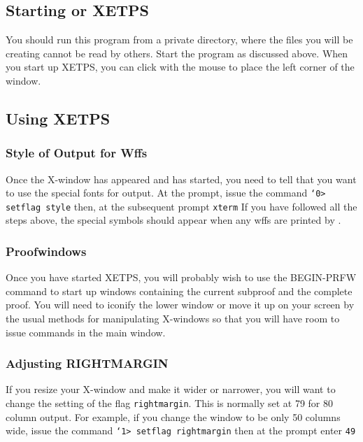 \documentclass{article}
\begin{document}
\subsection{Starting {\ETPS} or XETPS}

You should run this program from a private directory, where the files
you will be creating cannot be read by others. Start the program as
discussed above. When you start up XETPS, you can click with the mouse
to place the left corner of the window.

\subsection{Using XETPS}

\subsubsection{Style of Output for Wffs}

Once the X-window has appeared and {\ETPS} has started, you need to tell
{\ETPS} that you want to use the special fonts for output.  At the {\ETPS}
prompt, issue the command \newline{}
{\tt {\tt\char`\<}0> setflag style} \newline{}
then, at the subsequent prompt \newline{}
{\tt xterm}\newline{}
If you have followed all the steps
above, the special symbols should appear when any wffs are printed by
{\ETPS}.

\subsubsection{Proofwindows}

Once you have started XETPS, you will probably wish to use the
BEGIN-PRFW command to start up windows containing the current subproof
and the complete proof.  You will need to iconify the lower window or
move it up on your screen by the usual methods for manipulating
X-windows so that you will have room to issue commands in the main
{\ETPS} window.

\subsubsection{Adjusting RIGHTMARGIN}

If you resize your {\ETPS} X-window and make it wider or narrower, you will
want to change the setting of the flag {\tt rightmargin}.  This is normally
set at 79 for 80 column output.  For example, if you change the window to be
only 50 columns wide, issue the command \newline{}
{\tt {\tt\char`\<}1> setflag rightmargin}\newline{}
then at the prompt enter\newline{}
 {\tt 49}
\end{document}
